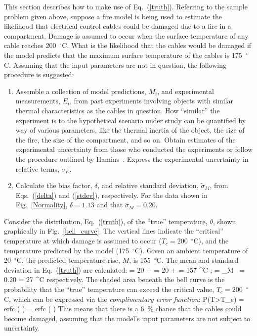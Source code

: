 This section describes how to make use of Eq.~(\ref{truth}). Referring to the sample problem given above, suppose a fire model is being used to estimate the likelihood that
electrical control cables could be damaged due to a fire in a compartment.
Damage is assumed to occur when the surface temperature of any cable reaches 200~$^\circ$C.
What is the likelihood that the cables would be damaged if the
model predicts that the maximum surface temperature of the cables is 175~$^\circ$C. Assuming that the input parameters are not in question, the following
procedure is suggested:
\begin{enumerate}
\item Assemble a collection of model predictions, $M_i$, and experimental measurements, $E_i$, from
past experiments involving objects with similar thermal characteristics as the cables in question.
How ``similar'' the experiment is to the hypothetical scenario under study can be quantified by way of
various parameters, like the thermal inertia of the object, the size of the fire, the size of the compartment, and so on. Obtain estimates of the
experimental uncertainty from those who conducted the experiments or follow the procedure outlined by Hamins~\cite{NUREG_1824}. Express the
experimental uncertainty in relative terms, $\widetilde{\sigma}_E$.
\item Calculate the bias factor, $\delta$, and relative standard deviation, $\tilde{\sigma}_M$, from Eqs.~(\ref{delta}) and (\ref{stdev}), respectively.
For the data shown in Fig.~\ref{Normality}, $\delta=1.13$ and that $\widetilde{\sigma}_M=0.20$.
\end{enumerate}
Consider the distribution, Eq.~(\ref{truth}), of the ``true'' temperature, $\theta$, shown graphically in Fig.~\ref{bell_curve}.
The vertical lines indicate the ``critical'' temperature at which damage is assumed to occur ($T_c=200$~$^\circ$C), and the temperature predicted by the
model (175~$^\circ$C). Given an ambient temperature of 20~$^\circ$C, the predicted temperature rise, $M$, is 155~$^\circ$C.
The mean and standard deviation in Eq.~(\ref{truth}) are calculated:
\be \mu = 20 +  = 20 +  = 157 \; ^\circ \hbox{C}  \quad ; \quad
   \sigma = \widetilde{\sigma}_M \,  = 0.20 \times {} = 27 \; ^\circ \hbox{C}  \ee
respectively. The shaded area beneath the bell curve is the probability that the ``true'' temperature can exceed the
critical value, $T_c=200$~$^\circ$C, which can be expressed via the {\em complimentary error function}:
\be P(T>T_c) =  \hbox{erfc} \left(  \right) =  \hbox{erfc} \left(  \right)   \ee
This means that there is a 6~\% chance that the cables could become damaged, assuming that the model's input parameters are not
subject to uncertainty.



